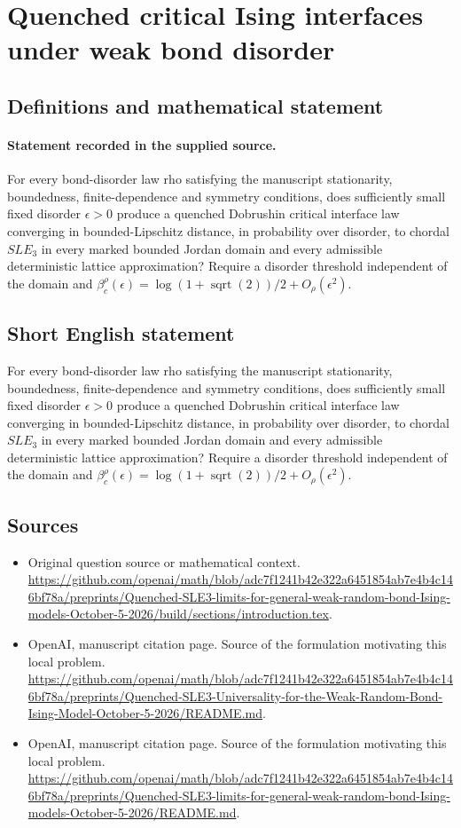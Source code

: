 \documentclass[11pt]{article}
\begin{document}
\section*{Quenched critical Ising interfaces under weak bond disorder}\label{30007411}
\subsection{Definitions and mathematical statement}
\paragraph{Statement recorded in the supplied source.}
For every bond-disorder law rho satisfying the manuscript stationarity, boundedness, finite-dependence and symmetry conditions, does sufficiently small fixed disorder $\epsilon >0$ produce a quenched Dobrushin critical interface law converging in bounded-Lipschitz distance, in probability over disorder, to chordal $SLE_3$ in every marked bounded Jordan domain and every admissible deterministic lattice approximation? Require a disorder threshold independent of the domain and $\beta _c^\rho (\epsilon )=\log (1+\operatorname{sqrt}(2))/2+O_\rho (\epsilon ^2)$.
\subsection{Short English statement}
For every bond-disorder law rho satisfying the manuscript stationarity, boundedness, finite-dependence and symmetry conditions, does sufficiently small fixed disorder $\epsilon >0$ produce a quenched Dobrushin critical interface law converging in bounded-Lipschitz distance, in probability over disorder, to chordal $SLE_3$ in every marked bounded Jordan domain and every admissible deterministic lattice approximation? Require a disorder threshold independent of the domain and $\beta _c^\rho (\epsilon )=\log (1+\operatorname{sqrt}(2))/2+O_\rho (\epsilon ^2)$.
\subsection{Sources}
\begin{itemize}
\item[S1] Original question source or mathematical context.
\url{https://github.com/openai/math/blob/adc7f1241b42e322a6451854ab7e4b4c146bf78a/preprints/Quenched-SLE3-limits-for-general-weak-random-bond-Ising-models-October-5-2026/build/sections/introduction.tex}.
\item[S2] OpenAI, manuscript citation page. Source of the formulation motivating this local problem.
\url{https://github.com/openai/math/blob/adc7f1241b42e322a6451854ab7e4b4c146bf78a/preprints/Quenched-SLE3-Universality-for-the-Weak-Random-Bond-Ising-Model-October-5-2026/README.md}.
\item[S3] OpenAI, manuscript citation page. Source of the formulation motivating this local problem.
\url{https://github.com/openai/math/blob/adc7f1241b42e322a6451854ab7e4b4c146bf78a/preprints/Quenched-SLE3-limits-for-general-weak-random-bond-Ising-models-October-5-2026/README.md}.
\end{itemize}
\end{document}
